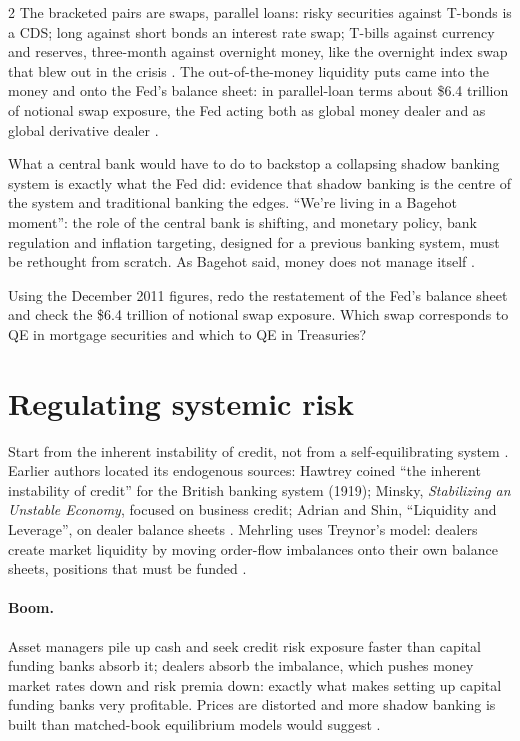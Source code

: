 \begin{paracol}{2}
The bracketed pairs are swaps, parallel loans: risky securities against T-bonds is a CDS; long against short bonds an interest rate swap; T-bills against currency and
reserves, three-month against overnight money, like the overnight index swap that blew out in the crisis . The
out-of-the-money liquidity puts came into the money and onto the Fed's balance sheet: in parallel-loan terms about \$6.4 trillion of notional swap exposure, the Fed
acting both as global money dealer and as global derivative dealer .

\begin{intuition}
What a central bank would have to do to backstop a collapsing shadow banking system is exactly what the Fed did: evidence that shadow banking is the centre of the
system and traditional banking the edges. ``We're living in a Bagehot moment'': the role of the central bank is shifting, and monetary policy, bank regulation and
inflation targeting, designed for a previous banking system, must be rethought from scratch. As Bagehot said, money does not manage itself
.
\end{intuition}

\begin{exercise}
Using the December 2011 figures, redo the restatement of the Fed's balance sheet and check the \$6.4 trillion of notional swap exposure. Which swap corresponds to QE in
mortgage securities and which to QE in Treasuries?
\end{exercise}

\section{Regulating systemic risk}\label{sec:cbs-systemic}

Start from the inherent instability of credit, not from a self-equilibrating system . Earlier authors located its endogenous sources:
Hawtrey coined ``the inherent instability of credit'' for the British banking system (1919); Minsky, \emph{Stabilizing an Unstable Economy}, focused on business
credit; Adrian and Shin, ``Liquidity and Leverage'', on dealer balance sheets . Mehrling uses Treynor's model: dealers
create market liquidity by moving order-flow imbalances onto their own balance sheets, positions that must be funded .

\paragraph{Boom.} Asset managers pile up cash and seek credit risk exposure faster than capital funding banks absorb it; dealers absorb the imbalance, which pushes
money market rates down and risk premia down: exactly what makes setting up capital funding banks very profitable. Prices are distorted and more shadow banking is
built than matched-book equilibrium models would suggest .


\end{paracol}
